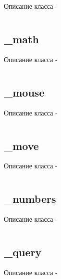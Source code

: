\documentclass[a4paper, 14pt]{extarticle}
\begin{document}
Описание класса  -
\begin{lstlisting}[numbers=none]

\end{lstlisting}

\subsection{{\color{orange} \_math}}

Описание класса  -
\begin{lstlisting}[numbers=none]

\end{lstlisting}

\subsection{{\color{orange} \_mouse}}

Описание класса  -
\begin{lstlisting}[numbers=none]

\end{lstlisting}

\subsection{{\color{orange} \_move}}

Описание класса  -
\begin{lstlisting}[numbers=none]

\end{lstlisting}

\subsection{{\color{orange} \_numbers}}

Описание класса  -
\begin{lstlisting}[numbers=none]

\end{lstlisting}

\subsection{{\color{orange} \_query}}

Описание класса  -
\begin{lstlisting}[numbers=none]

\end{lstlisting}
\end{document}
